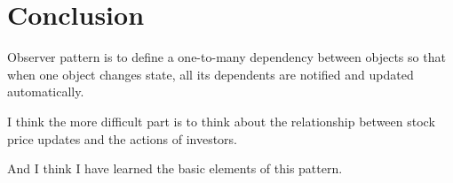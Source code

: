 \documentclass{article}
\begin{document}
\section{Conclusion}

    Observer pattern is to define a one-to-many dependency between objects so that when one object changes state, all its dependents are notified and updated automatically.
    
    I think the more difficult part is to think about the relationship between stock price updates and the actions of investors. 
    
    And I think I have learned the basic elements of this pattern.
\end{document}
